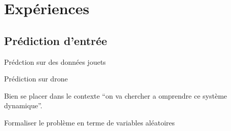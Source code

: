 \chapter{Expériences}
\graphicspath{{04-Analyse/}}

\section{Prédiction d'entrée}

Prédction sur des données jouets

Prédiction sur drone



Bien se placer dans le contexte “on va chercher a omprendre ce système dynamique”.

Formaliser le problème en terme de variables aléatoires